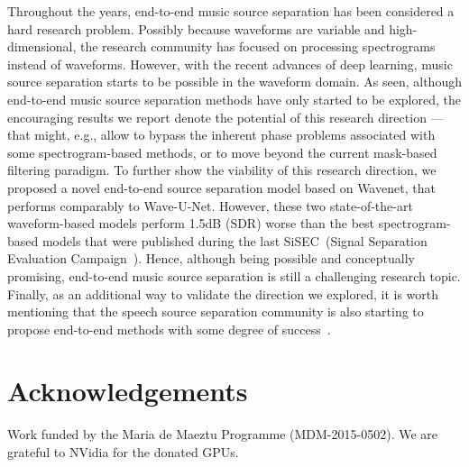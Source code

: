 \documentclass[a4paper]{article}
\begin{document}
Throughout the years, end-to-end music source separation has been considered a hard research problem. Possibly because waveforms are variable and high-dimensional, the research community has focused on processing spectrograms instead of waveforms. 
However, with the recent advances of deep learning, music source separation starts to be possible in the waveform domain. 
As seen, although end-to-end music source separation methods have only started to be explored, the encouraging results we report denote the potential of this research direction --- that might, e.g., allow to bypass the inherent phase problems associated with some spectrogram-based methods, or to move beyond the current mask-based filtering paradigm.
To further show the viability of this research direction, we proposed a novel end-to-end source separation model based on Wavenet, that performs comparably to Wave-U-Net.
However, these two state-of-the-art waveform-based models perform 1.5dB (SDR) worse than the best spectrogram-based models that were published during the last SiSEC~(Signal Separation Evaluation Campaign~\cite{stoter20182018}).
Hence, although being possible and conceptually promising, end-to-end music source separation is still a challenging research topic.
Finally, as an additional way to validate the direction we explored, it is worth mentioning that the speech source separation community is also starting to propose end-to-end methods with some degree of success~\cite{venkataramani2017end,venkataramani2018end,luo2017tasnet}. 


\section{Acknowledgements}

Work funded by the Maria de Maeztu Programme (MDM-2015-0502). We are grateful to NVidia for the donated GPUs.





\end{document}
